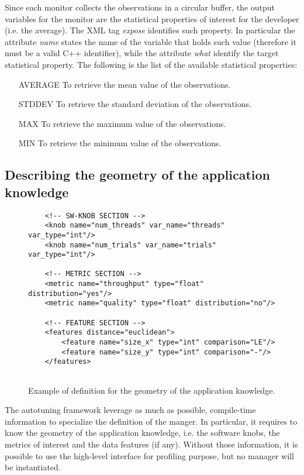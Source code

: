 Since each monitor collects the observations in a circular buffer, the output variables for the monitor are the statistical properties of interest for the developer (i.e. the average).
The XML tag \textit{expose} identifies such property.
In particular the attribute \textit{name} states the name of the variable that holds such value (therefore it must be a valid C++ identifier), while the attribute \textit{what} identify the target statistical property.
The following is the list of the available statistical properties:
\begin{enumerate}
	\item[AVERAGE] To retrieve the mean value of the observations.
	\item[STDDEV] To retrieve the standard deviation of the observations.
	\item[MAX] To retrieve the maximum value of the observations.
	\item[MIN] To retrieve the minimum value of the observations.
\end{enumerate}


\subsection{Describing the geometry of the application knowledge}


\begin{figure}
	\lstset{language=XML}
	\begin{lstlisting}
	<!-- SW-KNOB SECTION -->
	<knob name="num_threads" var_name="threads" var_type="int"/>
	<knob name="num_trials" var_name="trials" var_type="int"/>
	
	<!-- METRIC SECTION -->
	<metric name="throughput" type="float" distribution="yes"/>
	<metric name="quality" type="float" distribution="no"/>
	
	<!-- FEATURE SECTION -->
	<features distance="euclidean">
		<feature name="size_x" type="int" comparison="LE"/>
		<feature name="size_y" type="int" comparison="-"/>
	</features>
	
	\end{lstlisting}
	\caption{Example of definition for the geometry of the application knowledge.}
	\label{code:geometry_xml}
\end{figure}

The autotuning framework leverage as much as possible, compile-time information to specialize the definition of the manger.
In particular, it requires to know the geometry of the application knowledge, i.e. the software knobs, the metrics of interest and the data features (if any).
Without those information, it is possible to use the high-level interface for profiling purpose, but no manager will be instantiated.


